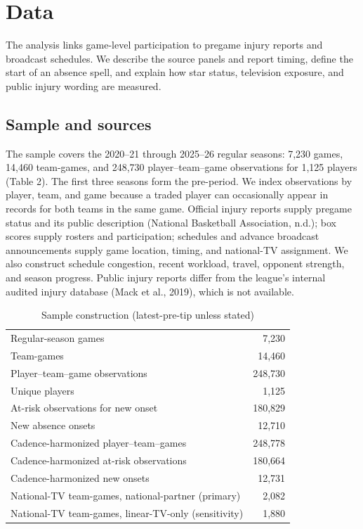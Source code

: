 \documentclass[11pt]{article}
\begin{document}
\FloatBarrier
\section{Data}\label{sec:data}

The analysis links game-level participation to pregame injury reports and broadcast schedules. We describe the source panels and report timing, define the start of an absence spell, and explain how star status, television exposure, and public injury wording are measured.

\subsection{Sample and sources}

The sample covers the 2020--21 through 2025--26 regular seasons: 7,230 games, 14,460 team-games, and 248,730 player--team--game observations for 1,125 players (Table 2). The first three seasons form the pre-period. We index observations by player, team, and game because a traded player can occasionally appear in records for both teams in the same game. Official injury reports supply pregame status and its public description (National Basketball Association, n.d.); box scores supply rosters and participation; schedules and advance broadcast announcements supply game location, timing, and national-TV assignment. We also construct schedule congestion, recent workload, travel, opponent strength, and season progress. Public injury reports differ from the league's internal audited injury database (Mack et al., 2019), which is not available.

\begin{table}[H]\centering\caption{Sample construction (latest-pre-tip unless stated)}\small
\begin{tabular}{@{}lr@{}}\toprule
Regular-season games & 7,230\\ Team-games & 14,460\\ Player--team--game observations & 248,730\\ Unique players & 1,125\\ At-risk observations for new onset & 180,829\\ New absence onsets & 12,710\\ Cadence-harmonized player--team--games & 248,778\\ Cadence-harmonized at-risk observations & 180,664\\ Cadence-harmonized new onsets & 12,731\\ National-TV team-games, national-partner (primary) & 2,082\\ National-TV team-games, linear-TV-only (sensitivity) & 1,880\\\bottomrule
\end{tabular}\end{table}
\end{document}
